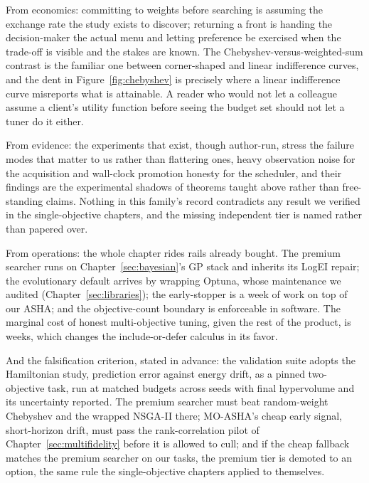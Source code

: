 From economics: committing to weights before searching is assuming
the exchange rate the study exists to discover; returning a front is
handing the decision-maker the actual menu and letting preference be
exercised when the trade-off is visible and the stakes are known.
The Chebyshev-versus-weighted-sum contrast is the familiar one
between corner-shaped and linear indifference curves, and the dent
in Figure~\ref{fig:chebyshev} is precisely where a linear
indifference curve misreports what is attainable. A reader who
would not let a colleague assume a client's utility function before
seeing the budget set should not let a tuner do it either.

From evidence: the experiments that exist, though author-run, stress
the failure modes that matter to us rather than flattering ones,
heavy observation noise for the acquisition and wall-clock
promotion honesty for the scheduler, and their findings are the
experimental shadows of theorems taught above rather than
free-standing claims. Nothing in this family's record contradicts
any result we verified in the single-objective chapters, and the
missing independent tier is named rather than papered over.

From operations: the whole chapter rides rails already bought. The
premium searcher runs on Chapter~\ref{sec:bayesian}'s GP stack and
inherits its LogEI repair; the evolutionary default arrives by
wrapping Optuna, whose maintenance we audited
(Chapter~\ref{sec:libraries}); the early-stopper is a week of work
on top of our ASHA; and the objective-count boundary is enforceable
in software. The marginal cost of honest multi-objective tuning,
given the rest of the product, is weeks, which changes the
include-or-defer calculus in its favor.

And the falsification criterion, stated in advance: the validation
suite adopts the Hamiltonian study, prediction error against energy
drift, as a pinned two-objective task, run at matched budgets across
seeds with final hypervolume and its uncertainty reported. The
premium searcher must beat random-weight Chebyshev and the wrapped
NSGA-II there; MO-ASHA's cheap early signal, short-horizon drift,
must pass the rank-correlation pilot of
Chapter~\ref{sec:multifidelity} before it is allowed to cull; and if
the cheap fallback matches the premium searcher on our tasks, the
premium tier is demoted to an option, the same rule the
single-objective chapters applied to themselves.

